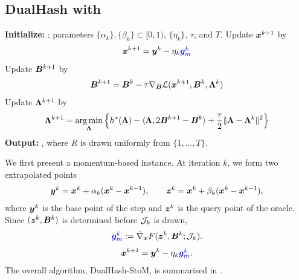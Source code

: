 \subsection{DualHash with }
\label{Sec: DualHash StoM}
\begin{algorithm}[t]
\color{black}
\caption{DualHash-StoM}
\label{alg:our_algorithm_sgdm}
\begin{algorithmic}[1]
\STATE \textbf{Initialize:} ; parameters $\{\alpha_k\},\{\beta_k\}\subset[0,1)$, $\{\eta_k\}$, $\tau$, and $T$.
  \STATE {}
  \STATE {}
  \STATE Update $\bm{x}^{k+1}$ by
  \[
  \bm{x}^{k+1} = \bm{y}^k - \eta_k {\color{blue}\bm{g}_m^k}
  \]
  \STATE Update $\bm{B}^{k+1}$ by
  \[
  \bm{B}^{k+1} = \bm{B}^k - \tau \nabla_{\bm{B}}\mathcal{L}(\bm{x}^{k+1}, \bm{B}^k, \bm{\Lambda}^k)
  \]
  \STATE Update $\bm{\Lambda}^{k+1}$ by
  \[
  \bm{\Lambda}^{k+1} = \operatorname*{arg\,min}_{\bm{\Lambda}} \Big\{ h^*(\bm{\Lambda}) - \langle \bm{\Lambda}, 2\bm{B}^{k+1} - \bm{B}^k \rangle + \frac{\tau}{2} \| \bm{\Lambda} - \bm{\Lambda}^k\|^2 \Big\}
  \]
\ENDFOR
\STATE \textbf{Output:} { , where $R$ is drawn uniformly from $\{1,\ldots,T\}$.}
\end{algorithmic}
\end{algorithm}
We first present a momentum-based instance. At iteration $k$, we form two extrapolated points
\begin{equation}
\label{Eq: extrapolated points in SGDM}
\by^k=\bx^k+\alpha_k(\bx^k-\bx^{k-1}),\qquad
\bz^k=\bx^k+\beta_k(\bx^k-\bx^{k-1}),
\end{equation}
where $\bm{y}^k$ is the base point of the step and $\bm{z}^k$ is the query point of the oracle. Since $(\bm{z}^k,\bm{B}^k)$ is determined before $\mathcal{J}_k$ is drawn, 
\begin{equation}
\label{Eq: the stochastic approximate in SGDM}
\blue{\bg_m^k} := \tilde{\nabla}_{\bx}F(\bz^k,\bB^k;\calJ_k).
\end{equation}
\begin{equation}
\label{Eq: the update of x in SGDM}
\bx^{k+1} = \by^k - \eta_k \blue{\bg_m^k}.
\end{equation}
The overall algorithm, DualHash-StoM, is summarized in .

